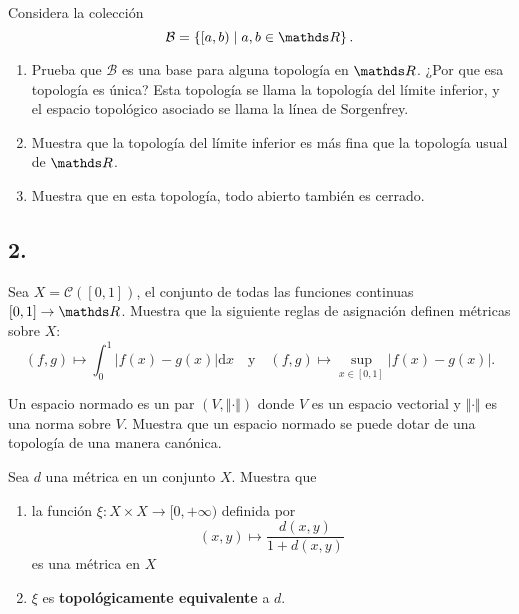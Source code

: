 \documentclass[b5paper,10pt,twoside]{book}
\begin{document}
\begin{problem}
Considera  la colección 
\[
\mathcal{B} = \left\{ 
    [a,b) \mid a,b\in\R
 \right\}.
\]
\begin{enumerate}[label=(\roman*)]
\item Prueba  que \(\mathcal{B}\) es una base para alguna topología en \(\R\). ¿Por que esa topología es única? Esta topología se llama la topología
del límite inferior,
y el espacio topológico asociado se llama 
la línea de Sorgenfrey.


\item Muestra que la  topología
del límite inferior es más fina que la topología usual de \(\R\).

\item Muestra que en esta topología, todo abierto también es cerrado.
\end{enumerate}





\end{problem}

\subsection*{2.\enspace }


\begin{problem}
Sea \(X=\mathcal{C}([0,1])\), el conjunto de todas las funciones continuas \([0,1]\to \R\).
Muestra que la
siguiente reglas de asignación 
definen métricas sobre \(X\):
\[
(f,g) \mapsto \int_0^1 |f(x) - g(x)|\mathrm{d}x
\quad\text{y}\quad
(f,g) \mapsto \sup_{x\in[0,1]} |f(x) - g(x)|.
\]

\end{problem}
 

\begin{problem}
Un espacio normado es un par \((V, \Vert \cdot \Vert)\) donde \(V\) es un espacio vectorial y \(\Vert \cdot \Vert\) es una norma sobre \(V\).
Muestra que un espacio normado se puede dotar de una topología de una manera canónica.
\end{problem}


\begin{problem}
Sea $d$ una métrica en un conjunto $X$.
Muestra que
\begin{enumerate}[label=(\roman*)]
\item la función ${\xi} : X \times X \to [0, +\infty)$ definida por 
\[
(x, y) \mapsto \frac{d(x, y)}{1 + d(x, y)}
\]
es una métrica en $X$

\item \(\xi\) es \textbf{topológicamente equivalente} a \(d\).
\end{enumerate}
\end{problem}
\end{document}
